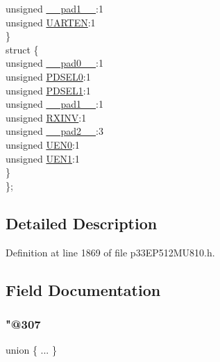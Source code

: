 \begin{DoxyCompactItemize}
\begin{tabbing}
\>\>unsigned \hyperlink{structtag_u3_m_o_d_e_b_i_t_s_acaf2d0924a107ec6e8d2e31febaf66f9}{\_\_pad1\_\_}:1\\
\>\>unsigned \hyperlink{structtag_u3_m_o_d_e_b_i_t_s_a71c27a2a2a21a1e41f5d969caaedc4ce}{UARTEN}:1\\
\>\} \\
\>struct \{\\
\>\>unsigned \hyperlink{structtag_u3_m_o_d_e_b_i_t_s_adf71f3d8410c1f1dbbc96680a92c49af}{\_\_pad0\_\_}:1\\
\>\>unsigned \hyperlink{structtag_u3_m_o_d_e_b_i_t_s_a3b06981d12ef9472672b5afa3fcb1096}{PDSEL0}:1\\
\>\>unsigned \hyperlink{structtag_u3_m_o_d_e_b_i_t_s_abd9cead9920f08c4dffa97b0c9210cbc}{PDSEL1}:1\\
\>\>unsigned \hyperlink{structtag_u3_m_o_d_e_b_i_t_s_acaf2d0924a107ec6e8d2e31febaf66f9}{\_\_pad1\_\_}:1\\
\>\>unsigned \hyperlink{structtag_u3_m_o_d_e_b_i_t_s_a53e5f9028d2bcb77dfd7b2cdb49809fe}{RXINV}:1\\
\>\>unsigned \hyperlink{structtag_u3_m_o_d_e_b_i_t_s_a4d97cc5f7d51d22fc2bf3eab35c9cb7f}{\_\_pad2\_\_}:3\\
\>\>unsigned \hyperlink{structtag_u3_m_o_d_e_b_i_t_s_acdbd7f8b51f26e512915a94d8d8f6c0d}{UEN0}:1\\
\>\>unsigned \hyperlink{structtag_u3_m_o_d_e_b_i_t_s_ab3c4d77b59c26a79b60548ef7ea7fd38}{UEN1}:1\\
\>\} \\
\}; \\

\end{tabbing}\end{DoxyCompactItemize}


\subsection{Detailed Description}


Definition at line 1869 of file p33\+E\+P512\+M\+U810.\+h.



\subsection{Field Documentation}
\mbox{\label{structtag_u3_m_o_d_e_b_i_t_s_a24d05086c1ea0fc7d9fad5927b1ee9a8}} 
\subsubsection{\texorpdfstring{"@307}{@307}}
{\footnotesize\ttfamily union \{ ... \} }

